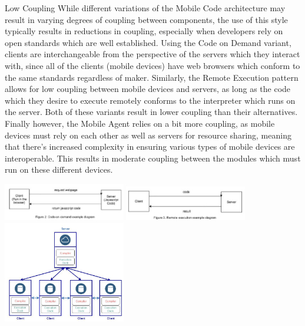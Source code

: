 \begin{nfps}
\item[Low Coupling] While different variations of the Mobile Code architecture
    may result in varying degrees of coupling between components, the use of
    this style typically results in reductions in coupling, especially when
    developers rely on open standards which are well established. Using the
    Code on Demand variant, clients are interchangeable from the perspective of
    the servers which they interact with, since all of the clients (mobile
    devices) have web browsers which conform to the same standards regardless
    of maker. Similarly, the Remote Execution pattern allows for low coupling
    between mobile devices and servers, as long as the code which they desire
    to execute remotely conforms to the interpreter which runs on the server.
    Both of these variants result in lower coupling than their alternatives.
    Finally however, the Mobile Agent relies on a bit more coupling, as mobile
    devices must rely on each other as well as servers for resource sharing,
    meaning that there’s increased complexity in ensuring various types of
    mobile devices are interoperable. This results in moderate coupling between
    the modules which must run on these different devices.
\end{nfps}

\begin{center}
    \includegraphics[width=0.4\textwidth]{./mobile-code1}
    \includegraphics[width=0.4\textwidth]{./mobile-code2}
    \includegraphics[width=0.4\textwidth]{./mobile-code3}
\end{center}
